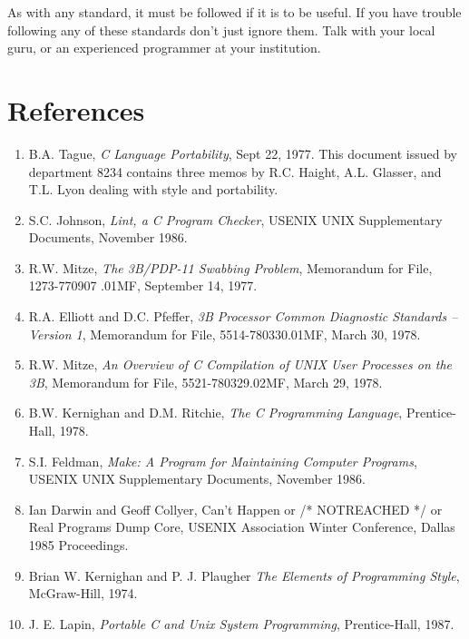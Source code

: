  As with any standard, it must be followed if it is to be useful. If you have
trouble following any of these standards don't just ignore them. Talk with
your local guru, or an experienced programmer at your institution. 

\section{References}
\begin{enumerate}
\item B.A. Tague, {\em C Language Portability}, Sept 22, 1977. This document
issued by department 8234 contains three memos by R.C. Haight, A.L. Glasser,
and T.L. Lyon dealing with  style and portability. 

\item S.C. Johnson, {\em Lint, a C Program Checker}, USENIX UNIX
Supplementary Documents,  November 1986. 

\item R.W. Mitze, {\em The 3B/PDP-11 Swabbing Problem}, Memorandum for File, 
1273-770907 .01MF, September 14, 1977. 

\item R.A. Elliott and D.C. Pfeffer, {\em 3B Processor Common Diagnostic
Standards -- Version 1},  Memorandum for File, 5514-780330.01MF, March 30, 1978. 

\item R.W. Mitze, {\em  An Overview of C Compilation of UNIX User Processes on
the 3B}, Memorandum for File, 5521-780329.02MF, March 29, 1978. 

\item B.W. Kernighan and D.M. Ritchie, {\em The C Programming Language},
Prentice-Hall, 1978. 

\item S.I. Feldman, {\em Make: A Program for Maintaining Computer Programs},
USENIX UNIX Supplementary Documents, November 1986. 

\item Ian Darwin and Geoff Collyer, Can't Happen or /* NOTREACHED */ or Real
Programs Dump Core, USENIX Association Winter Conference, Dallas 1985
Proceedings. 

\item Brian W. Kernighan and P. J. Plaugher {\em The Elements of Programming
Style}, McGraw-Hill, 1974.

\item J. E. Lapin, {\em Portable C and Unix System Programming},
Prentice-Hall, 1987.
\end{enumerate}
\newpage
